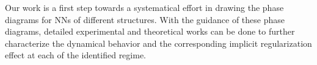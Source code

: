 \documentclass{article}
\begin{document}

Our work is a first step towards a systematical effort in drawing the phase diagrams for NNs of different structures. With the guidance of these phase diagrams, detailed experimental and theoretical works can be done to further characterize the dynamical behavior and the corresponding implicit regularization effect at each of the identified regime.



\end{document}
